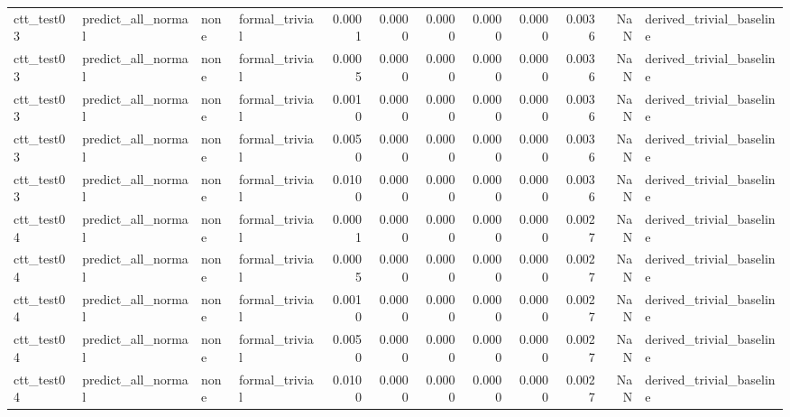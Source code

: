 \begin{tabular}{llllrrrrrrrl}
ctt_test03 & predict_all_normal & none & formal_trivial & 0.0001 & 0.0000 & 0.0000 & 0.0000 & 0.0000 & 0.0036 & NaN & derived_trivial_baseline \\
ctt_test03 & predict_all_normal & none & formal_trivial & 0.0005 & 0.0000 & 0.0000 & 0.0000 & 0.0000 & 0.0036 & NaN & derived_trivial_baseline \\
ctt_test03 & predict_all_normal & none & formal_trivial & 0.0010 & 0.0000 & 0.0000 & 0.0000 & 0.0000 & 0.0036 & NaN & derived_trivial_baseline \\
ctt_test03 & predict_all_normal & none & formal_trivial & 0.0050 & 0.0000 & 0.0000 & 0.0000 & 0.0000 & 0.0036 & NaN & derived_trivial_baseline \\
ctt_test03 & predict_all_normal & none & formal_trivial & 0.0100 & 0.0000 & 0.0000 & 0.0000 & 0.0000 & 0.0036 & NaN & derived_trivial_baseline \\
ctt_test04 & predict_all_normal & none & formal_trivial & 0.0001 & 0.0000 & 0.0000 & 0.0000 & 0.0000 & 0.0027 & NaN & derived_trivial_baseline \\
ctt_test04 & predict_all_normal & none & formal_trivial & 0.0005 & 0.0000 & 0.0000 & 0.0000 & 0.0000 & 0.0027 & NaN & derived_trivial_baseline \\
ctt_test04 & predict_all_normal & none & formal_trivial & 0.0010 & 0.0000 & 0.0000 & 0.0000 & 0.0000 & 0.0027 & NaN & derived_trivial_baseline \\
ctt_test04 & predict_all_normal & none & formal_trivial & 0.0050 & 0.0000 & 0.0000 & 0.0000 & 0.0000 & 0.0027 & NaN & derived_trivial_baseline \\
ctt_test04 & predict_all_normal & none & formal_trivial & 0.0100 & 0.0000 & 0.0000 & 0.0000 & 0.0000 & 0.0027 & NaN & derived_trivial_baseline \\
\bottomrule
\end{tabular}
